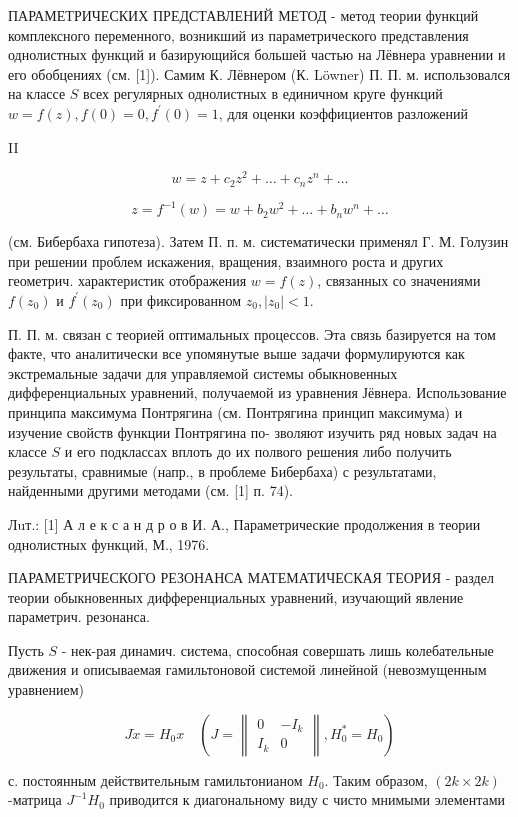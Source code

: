 \documentclass[10pt]{article}
\begin{document}
ПАРАМЕТРИЧЕСКИХ ПРЕДСТАВЛЕНИЙ МЕТОД - метод теории функций комплексного переменного, возникший из параметрического представления однолистных функций и базирующийся большей частью на Лёвнера уравнении и его обобцениях (см. [1]). Самим К. Лёвнером (К. Löwner) П. П. м. использовался на классе $S$ всех регулярных однолистных в единичном круге функций $w=f(z), f(0)=0, f^{\prime}(0)=1$, для оценки коэффициентов разложений

II

\[
w=z+c_{2} z^{2}+\ldots+c_{n} z^{n}+\ldots
\]

\[
z=f^{-1}(w)=w+b_{2} w^{2}+\ldots+b_{n} w^{n}+\ldots
\]

(см. Бибербаха гипотеза). Затем П. п. м. систематически применял Г. М. Голузин при решении проблем искажения, вращения, взаимного роста и других геометрич. характеристик отображения $w=f(z)$, связанных со значениями $f\left(z_{0}\right)$ и $f^{\prime}\left(z_{0}\right)$ при фиксированном $z_{0},\left|z_{0}\right|<1$.

П. П. м. связан с теорией оптимальных процессов. Эта связь базируется на том факте, что аналитически все упомянутые выше задачи формулируются как экстремальные задачи для управляемой системы обыкновенных дифференциальных уравнений, получаемой из уравнения Јёвнера. Использование принципа максимума Понтрягина (см. Понтрягина принцип максимума) и изучение свойств функции Понтрягина по- зволяют изучить ряд новых задач на классе $S$ и его подклассах вплоть до их полвого решения либо получить результаты, сравнимые (напр., в проблеме Бибербаха) с результатами, найденными другими методами (см. [1] п. 74).

Лuт.: [1] А л е к с а н д р о в И. А., Параметрические продолжения в теории однолистных функций, М., 1976.

ПАРАМЕТРИЧЕСКОГО РЕЗОНАНСА МАТЕМАТИЧЕСКАЯ ТЕОРИЯ - раздел теории обыкновенных дифференциальных уравнений, изучающий явление параметрич. резонанса.

Пусть $S$ - нек-рая динамич. система, способная совершать лишь колебательные движения и описываемая гамильтоновой системой линейной (невозмущенным уравнением)

\[
J \dot{x}=H_{0} x \quad\left(J=\left\|\begin{array}{cc}
0 & -I_{k} \\
I_{k} & 0
\end{array}\right\|, H_{0}^{*}=H_{0}\right)
\]

с. постоянным действительным гамильтонианом $H_{0}$. Таким образом, $(2 k \times 2 k)$-матрица $J^{-1} H_{0}$ приводится к диагональному виду с чисто мнимыми элементами
\end{document}
